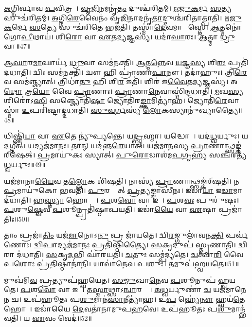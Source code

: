 \ul{𑌅}𑌗𑍍𑌨𑌿𑌰𑍍𑌵𑌾𑌵 \ul{𑌪}𑌵𑌿𑌤𑍍𑌰𑌮𑍍᳚।
\ul{𑌵𑍃}\ul{𑌜𑌿}𑌨𑌮𑌨𑍃॑\ul{𑌤𑌂} 𑌦𑍁𑌶𑍍𑌚॑𑌰𑌿𑌤𑌮𑍍।
\ul{𑌋}\ul{𑌜𑍁}\ul{𑌕}𑌰𑍍𑌮 \ul{𑌸}𑌤𑍍𑌯 𑌸𑍁𑌚॑𑌰𑌿𑌤𑌮𑍍।
\ul{𑌅}𑌗𑍍𑌨𑌿\ul{𑌰𑍇}𑌵𑍈𑌨𑌂॑ 𑌵𑍃\ul{𑌜𑌿}𑌨𑌾𑌦𑌨𑍃॑\ul{𑌤𑌾}𑌦𑍍𑌦𑍁𑌶𑍍𑌚॑𑌰𑌿𑌤𑌾𑌤𑍍𑌪𑌾𑌤𑌿।
\ul{𑌋}\ul{𑌜𑍁}\ul{𑌕}𑌰𑍍𑌮𑍇 \ul{𑌸}𑌤𑍍𑌯𑍇 𑌸𑍁𑌚॑𑌰𑌿𑌤𑍇 𑌭𑌜𑌤𑌿।
𑌤𑌸𑍍𑌮𑌾॑\ul{𑌦𑍇}𑌵𑌮𑌾 𑌶𑌾᳚𑌸𑍍𑌤𑍇।
\ul{𑌆}𑌤𑍍𑌮𑌨𑍋॑ 𑌗𑍋\ul{𑌪𑍀}𑌥𑌾𑌯॑।
𑌶𑌿\ul{𑌰𑍋} 𑌵𑌾 \ul{𑌏}𑌤\ul{𑌦𑍍𑌯}𑌜𑍍𑌞𑌸𑍍𑌯॑।
𑌯𑌦𑌾॑\ul{𑌘𑌾}𑌰𑌃।
\ul{𑌆}𑌤𑍍𑌮𑌾 \ul{𑌧𑍍𑌰𑍁}𑌵𑌾॥47॥

\ul{𑌆}\ul{𑌘𑌾}𑌰\ul{𑌮𑌾}𑌘𑌾𑌰𑍍𑌯॑ \ul{𑌧𑍍𑌰𑍁}𑌵𑌾 𑌸𑌮॑𑌨𑌕𑍍𑌤𑌿।
\ul{𑌆}𑌤𑍍𑌮\ul{𑌨𑍍𑌨𑍇}𑌵 \ul{𑌯}𑌜𑍍𑌞\ul{𑌸𑍍𑌯} 𑌶𑌿\ul{𑌰𑌃} 𑌪𑍍𑌰𑌤𑌿॑ 𑌦𑌧𑌾𑌤𑌿।
𑌦𑍍𑌵𑌿𑌃 𑌸𑌮॑𑌨𑌕𑍍𑌤𑌿।
𑌦𑍍𑌵𑍗 𑌹𑌿 𑌪𑍍𑌰𑌾॑𑌣𑌾\ul{𑌪𑌾}𑌨𑍗।
𑌤𑌦𑌾॑𑌹𑍁𑌃।
𑌤𑍍𑌰𑌿\ul{𑌰𑍇}𑌵 𑌸𑌮॑𑌞𑍍𑌜𑍍𑌯𑌾𑌤𑍍।
𑌤𑍍𑌰𑌿𑌧𑌾॑\ul{𑌤𑍁} 𑌹𑌿 𑌶𑌿\ul{𑌰} 𑌇𑌤𑌿॑।
𑌶𑌿𑌰॑ 𑌇\ul{𑌵𑍈}𑌤\ul{𑌦𑍍𑌯}𑌜𑍍𑌞𑌸𑍍𑌯॑।
𑌅\ul{𑌥𑍋} 𑌤𑍍𑌰\ul{𑌯𑍋} 𑌵𑍈 \ul{𑌪𑍍𑌰𑌾}𑌣𑌾𑌃।
\ul{𑌪𑍍𑌰𑌾}𑌣𑌾\ul{𑌨𑍇}𑌵𑌾𑌸𑍍𑌮𑌿॑𑌨𑍍𑌦𑌧𑌾𑌤𑌿।
\ul{𑌮}𑌖\ul{𑌸𑍍𑌯} 𑌶𑌿𑌰𑍋॑𑌽\ul{𑌸𑌿} 𑌸𑌞𑍍𑌜𑍍𑌯𑍋𑌤𑌿॑\ul{𑌷𑌾} 𑌜𑍍𑌯𑍋𑌤𑌿॑𑌰\ul{𑌙𑍍𑌕𑍍𑌤𑌾}𑌮𑌿𑌤𑍍𑌯𑌾॑𑌹।
𑌜𑍍𑌯𑍋𑌤𑌿॑\ul{𑌰𑍇}𑌵𑌾𑌸𑍍𑌮𑌾॑ \ul{𑌉}𑌪𑌰𑌿॑𑌷𑍍𑌟𑌾𑌦𑍍𑌦𑌧𑌾𑌤𑌿।
\ul{𑌸𑍁}\ul{𑌵}𑌰𑍍𑌗𑌸𑍍𑌯॑ \ul{𑌲𑍋}𑌕𑌸𑍍𑌯𑌾𑌨𑍁॑𑌖𑍍𑌯𑌾𑌤𑍍𑌯𑍈॥48॥\anuvakamend[𑌪𑌰𑌿॑𑌦𑌧𑌾𑌤𑌿 \ul{𑌪𑍍𑌰𑌾}𑌣𑌂 𑌦॑𑌧𑌾\ul{𑌤𑌿} 𑌹𑌿 \ul{𑌯}𑌜𑍍𑌞𑍋 𑌘𑌾॑𑌰𑌯\ul{𑌤𑌿} 𑌨\ul{𑌮} 𑌇𑌤𑍍𑌯𑌾॑𑌹 \ul{𑌪}𑌶𑍍𑌚𑌾\ul{𑌦𑍍𑌵𑍀}𑌰𑍍𑌯𑌾॑𑌣𑍀𑌤𑍍𑌯𑌾॑\ul{𑌹} 𑌭𑌾 𑌇𑌤𑍍𑌯𑌾॑𑌹 \ul{𑌭}𑌜𑍇𑌤𑍍𑌯𑌾॑𑌹 \ul{𑌧𑍍𑌰𑍁}𑌵𑍈𑌵𑌾𑌸𑍍𑌮𑌿॑𑌨𑍍𑌦𑌧𑌾\ul{𑌤𑌿} 𑌤𑍍𑌰𑍀𑌣𑌿॑ 𑌚]

𑌧𑌿𑌷𑍍𑌣𑌿॑\ul{𑌯𑌾} 𑌵𑌾 \ul{𑌏}𑌤𑍇 𑌨𑍍𑌯𑍁॑𑌪𑍍𑌯𑌨𑍍𑌤𑍇।
𑌯\ul{𑌦𑍍𑌬𑍍𑌰}𑌹𑍍𑌮𑌾।
𑌯𑌦𑍍𑌧𑍋𑌤𑌾᳚।
𑌯𑌦॑\ul{𑌧𑍍𑌵}𑌰𑍍𑌯𑍁𑌃।
𑌯\ul{𑌦}𑌗𑍍𑌨𑍀𑌤𑍍।
𑌯𑌦𑍍𑌯𑌜॑𑌮𑌾𑌨𑌃।
𑌤𑌾𑌨𑍍 𑌯𑌦॑𑌨𑍍𑌤\ul{𑌰𑍇}𑌯𑌾𑌤𑍍।
𑌯𑌜॑𑌮𑌾𑌨𑌸𑍍𑌯 \ul{𑌪𑍍𑌰𑌾}𑌣𑌾𑌨𑍍𑌥𑍍𑌸𑌙𑍍𑌕॑𑌰𑍍‌\mbox{}𑌷𑍇𑌤𑍍।
\ul{𑌪𑍍𑌰}𑌮𑌾𑌯𑍁॑𑌕𑌃 𑌸𑍍𑌯𑌾𑌤𑍍।
\ul{𑌪𑍁}\ul{𑌰𑍋}𑌡𑌾𑌶॑𑌮\ul{𑌪}𑌗𑍃\ul{𑌹𑍍𑌯} 𑌸𑌞𑍍𑌚॑𑌰𑌤𑍍𑌯\ul{𑌧𑍍𑌵}𑌰𑍍𑌯𑍁𑌃॥49॥

𑌯𑌜॑𑌮𑌾𑌨𑌾\ul{𑌯𑍈}𑌵 𑌤\ul{𑌲𑍍𑌲𑍋}𑌕 𑌶𑌿॑𑌷𑌤𑌿।
𑌨𑌾𑌸𑍍𑌯॑ \ul{𑌪𑍍𑌰𑌾}𑌣𑌾𑌨𑍍𑌥𑍍𑌸𑌙𑍍𑌕॑𑌰𑍍‌\mbox{}\-𑌷𑌤𑌿।
𑌨 \ul{𑌪𑍍𑌰}𑌮𑌾𑌯𑍁॑𑌕𑍋 𑌭𑌵𑌤𑌿।
\ul{𑌪𑍁}𑌰𑌸𑍍𑌤𑌾᳚𑌤𑍍 \ul{𑌪𑍍𑌰}𑌤𑍍𑌯𑌙𑍍𑌙𑌾𑌸𑍀॑𑌨𑌃।
𑌇𑌡𑌾॑\ul{𑌯𑌾} 𑌇\ul{𑌡𑌾}\-𑌮𑌾 𑌦॑𑌧𑌾𑌤𑌿।
𑌹\ul{𑌸𑍍𑌤𑍍𑌯𑌾}\ul{} 𑌹𑍋𑌤𑍍𑌰𑍇᳚।
\ul{𑌪}𑌶\ul{𑌵𑍋} 𑌵𑌾 𑌇𑌡𑌾᳚।
\ul{𑌪}𑌶\ul{𑌵𑌃} 𑌪𑍁𑌰𑍁॑𑌷𑌃।
\ul{𑌪}𑌶𑍁\ul{𑌷𑍍𑌵𑍇}𑌵 \ul{𑌪}𑌶𑍂𑌨𑍍𑌪𑍍𑌰𑌤𑌿॑\-𑌷𑍍𑌠𑌾𑌪𑌯𑌤𑌿।
𑌇𑌡𑌾॑\ul{𑌯𑍈} 𑌵𑌾 \ul{𑌏}𑌷𑌾 𑌪𑍍𑌰𑌜𑌾॑𑌤𑌿𑌃॥50॥

𑌤𑌾𑌂 𑌪𑍍𑌰𑌜𑌾॑\ul{𑌤𑌿𑌂} 𑌯𑌜॑\ul{𑌮𑌾}𑌨𑍋𑌽\ul{𑌨𑍁} 𑌪𑍍𑌰 𑌜𑌾॑𑌯𑌤𑍇।
𑌦𑍍𑌵𑌿\ul{𑌰}𑌙𑍍𑌗𑍁𑌲𑌾॑𑌵𑌨\ul{𑌕𑍍𑌤𑌿} 𑌪𑌰𑍍𑌵॑𑌣𑍋𑌃।
\ul{𑌦𑍍𑌵𑌿}𑌪𑌾𑌦𑍍𑌯𑌜॑𑌮𑌾\ul{𑌨𑌃} 𑌪𑍍𑌰𑌤𑌿॑\-𑌷𑍍𑌠𑌿𑌤𑍍𑌯𑍈।
\ul{𑌸}𑌕𑍃𑌦𑍁𑌪॑ 𑌸𑍍𑌤𑍃𑌣𑌾𑌤𑌿।
𑌦𑍍𑌵𑌿𑌰𑌾 𑌦॑𑌧𑌾𑌤𑌿।
\ul{𑌸}𑌕𑍃\ul{𑌦}𑌭𑌿 𑌘𑌾॑𑌰𑌯𑌤𑌿।
\ul{𑌚}𑌤𑍁𑌃 𑌸𑌮𑍍𑌪॑𑌦𑍍𑌯𑌤𑍇।
\ul{𑌚}𑌤𑍍𑌵𑌾\ul{𑌰𑌿} 𑌵𑍈 \ul{𑌪}𑌶𑍋𑌃 𑌪𑍍𑌰॑\ul{𑌤𑌿}𑌷𑍍𑌠𑌾𑌨𑌾॑𑌨𑌿।
𑌯𑌾𑌵𑌾॑\ul{𑌨𑍇}𑌵 \ul{𑌪}𑌶𑍁𑌃।
𑌤𑌮𑍁𑌪॑𑌹𑍍𑌵𑌯𑌤𑍇॥51॥

𑌮𑍁𑌖॑𑌮𑌿\ul{𑌵} 𑌪𑍍𑌰𑌤𑍍𑌯𑍁𑌪॑𑌹𑍍𑌵𑌯𑍇𑌤।
\ul{𑌸}\ul{𑌮𑍍𑌮𑍁}𑌖𑌾\ul{𑌨𑍇}𑌵 \ul{𑌪}𑌶𑍂𑌨𑍁𑌪॑ 𑌹𑍍𑌵𑌯𑌤𑍇।
\ul{𑌪}𑌶\ul{𑌵𑍋} 𑌵𑌾 𑌇𑌡𑌾᳚।
𑌤\ul{𑌸𑍍𑌮𑌾}𑌥𑍍𑌸𑌾\-𑌽\ul{𑌨𑍍𑌵𑌾}𑌰𑌭𑍍𑌯𑌾᳚।
\ul{𑌅}\ul{𑌧𑍍𑌵}𑌰𑍍𑌯𑍁𑌣𑌾॑ \ul{𑌚} 𑌯𑌜॑𑌮𑌾𑌨𑍇𑌨 𑌚।
𑌉𑌪॑𑌹𑍂𑌤𑌃 𑌪\ul{𑌶𑍁}𑌮𑌾𑌨॑\ul{𑌸𑌾}𑌨𑍀𑌤𑍍𑌯𑌾॑𑌹।
𑌉\ul{𑌪} 𑌹𑍍𑌯𑍇॑\ul{𑌨𑍗} 𑌹𑍍𑌵𑌯॑\ul{𑌤𑍇} 𑌹𑍋𑌤𑌾᳚।
𑌇𑌡𑌾॑𑌯𑍈 \ul{𑌦𑍇}𑌵𑌤𑌾॑𑌨𑌾𑌮𑍁𑌪\ul{𑌹}𑌵𑍇।
𑌉𑌪॑𑌹𑍂𑌤𑌃 𑌪\ul{𑌶𑍁}𑌮𑌾𑌨𑍍𑌭॑𑌵𑌤𑌿।
𑌯 \ul{𑌏}𑌵𑌂 𑌵𑍇𑌦॑॥52॥

